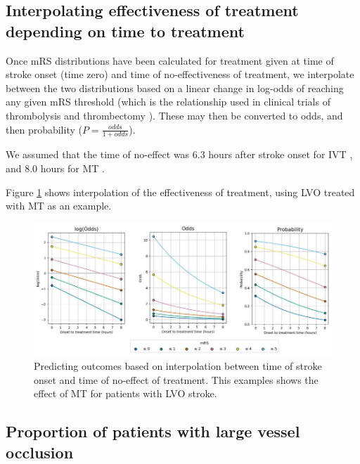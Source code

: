 \subsection{Interpolating effectiveness of treatment depending on time to treatment}

Once mRS distributions have been calculated for treatment given at time of stroke onset (time zero) and time of no-effectiveness of treatment, we interpolate between the two distributions based on a linear change in log-odds of reaching any given mRS threshold (which is the relationship used in clinical trials of thrombolysis and thrombectomy \cite{emberson_effect_2014, fransen_time_2016}). These may then be converted to odds, and then probability ($P = \frac{odds}{1 + odds}$).

We assumed that the time of no-effect was 6.3 hours after stroke onset for IVT \cite{emberson_effect_2014}, and 8.0 hours for MT \cite{fransen_time_2016}.

Figure \ref{fig:interpolation} shows interpolation of the effectiveness of treatment, using LVO treated with MT as an example.

\begin{figure}[h!]
    \centering
    \includegraphics[width=1.0\linewidth]{images_modelling/log_odds_to_probs.jpg}
    \caption{Predicting outcomes based on interpolation between time of stroke onset and time of no-effect of treatment. This examples shows the effect of MT for patients with LVO stroke.}
    \label{fig:interpolation}
\end{figure}

\subsection{Proportion of patients with large vessel occlusion}


